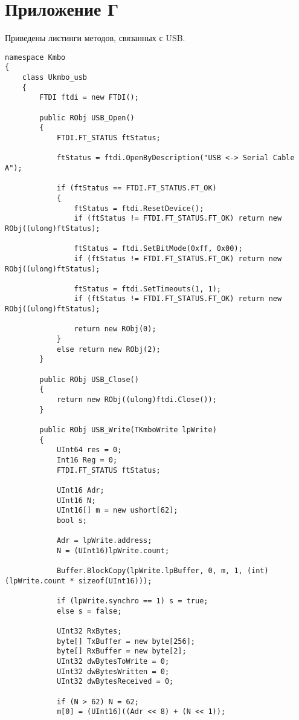 \section*{\hfill Приложение Г \hfill}
Приведены листинги методов, связанных с USB.

\begin{lstlisting}[label=usb,caption=Основные функции взаимодействия с USB]
namespace Kmbo
{
	class Ukmbo_usb
	{
		FTDI ftdi = new FTDI();
		
		public RObj USB_Open()
		{
			FTDI.FT_STATUS ftStatus;                                    
			
			ftStatus = ftdi.OpenByDescription("USB <-> Serial Cable A");
			
			if (ftStatus == FTDI.FT_STATUS.FT_OK)                      
			{
				ftStatus = ftdi.ResetDevice();                          
				if (ftStatus != FTDI.FT_STATUS.FT_OK) return new RObj((ulong)ftStatus); 
				
				ftStatus = ftdi.SetBitMode(0xff, 0x00);                 
				if (ftStatus != FTDI.FT_STATUS.FT_OK) return new RObj((ulong)ftStatus);   
				
				ftStatus = ftdi.SetTimeouts(1, 1);
				if (ftStatus != FTDI.FT_STATUS.FT_OK) return new RObj((ulong)ftStatus);
				
				return new RObj(0);
			}
			else return new RObj(2);
		}
		
		public RObj USB_Close()
		{
			return new RObj((ulong)ftdi.Close());
		}
		
		public RObj USB_Write(TKmboWrite lpWrite)
		{
			UInt64 res = 0;
			Int16 Reg = 0;
			FTDI.FT_STATUS ftStatus;
			
			UInt16 Adr;
			UInt16 N;
			UInt16[] m = new ushort[62];
			bool s;
			
			Adr = lpWrite.address;
			N = (UInt16)lpWrite.count;
			
			Buffer.BlockCopy(lpWrite.lpBuffer, 0, m, 1, (int)(lpWrite.count * sizeof(UInt16)));
			
			if (lpWrite.synchro == 1) s = true;
			else s = false;
			
			UInt32 RxBytes;                             
			byte[] TxBuffer = new byte[256];            
			byte[] RxBuffer = new byte[2];              
			UInt32 dwBytesToWrite = 0;                  
			UInt32 dwBytesWritten = 0;                  
			UInt32 dwBytesReceived = 0;                
			
			if (N > 62) N = 62;
			m[0] = (UInt16)((Adr << 8) + (N << 1));
			

\end{lstlisting}
